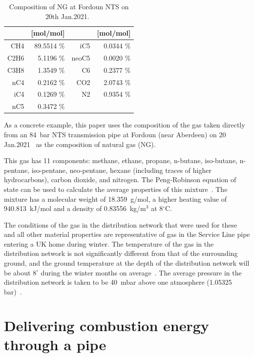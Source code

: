 \documentclass[5p]{elsarticle} %
\begin{document}
\begin{table}[htb]
    \centering
    \caption{Composition of NG at Fordoun NTS on 20th Jan.2021.~\citep{cngservices2019}}
    \label{tab:Fordoun}
    \begin{tabular}{r|r|r|r}
        & [mol/mol]  && [mol/mol]\\
        \hline
        CH4    & 89.5514  \% & iC5    &  0.0344 \%\\
        C2H6   &  5.1196  \% & neoC5  &  0.0020 \%\\
        C3H8   &  1.3549  \% & C6     &  0.2377 \%\\
        nC4    &  0.2162  \% & CO2    &  2.0743 \%\\
        iC4    &  0.1269  \% & N2     &  0.9354 \%\\
        nC5    &  0.3472  \% &   &  \\
         \hline
    \end{tabular}
\end{table}

As a concrete example, this paper uses the composition of the gas taken directly from an 84~bar NTS transmission pipe at Fordoun (near Aberdeen) on 20 Jan.2021~\citep{cngservices2019} as the composition of natural gas (NG). 

This gas has  11 components: methane, ethane, propane, n-butane, iso-butane, n-pentane, iso-pentane, neo-pentane, hexane (including traces of higher hydrocarbons), carbon dioxide, and nitrogen. 
The Peng-Robinson equation of state can be used to calculate the average properties
of this mixture~\citep{Sargents_github}. 
The mixture has a molecular weight of 18.359~g/mol, a higher heating value of 940.813~kJ/mol and a density of 0.83556~kg/m$^3$ at 8$^\circ$C.

The conditions of the gas in the distribution network that were used for these and all other material properties are representative of gas in the Service Line pipe entering a UK home during winter. 
The temperature of the gas in the distribution network is not significantly different from that of the surrounding ground, and the ground temperature at the depth of the distribution network will be about $8^\circ$ during the winter months  on average~\citep{MacKay2008}.
The average pressure in the distribution network is taken to be 40~mbar above one atmosphere (1.05325 bar)~\citep{ARUP2023,utonomy23}.

\section{Delivering combustion energy through a pipe}
\label{sec:pipe}
\end{document}
